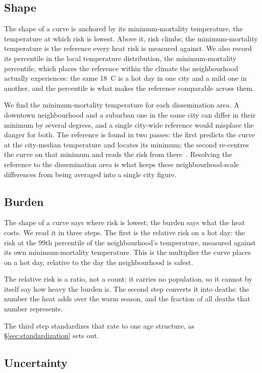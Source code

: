 \subsection{Shape}

The shape of a curve is anchored by its minimum-mortality temperature, the temperature at which risk is lowest. Above it, risk climbs; the minimum-mortality temperature is the reference every heat risk is measured against. We also record its percentile in the local temperature distribution, the minimum-mortality percentile, which places the reference within the climate the neighbourhood actually experiences: the same 18~\textdegree C is a hot day in one city and a mild one in another, and the percentile is what makes the reference comparable across them.

We find the minimum-mortality temperature for each dissemination area. A downtown neighbourhood and a suburban one in the same city can differ in their minimum by several degrees, and a single city-wide reference would misplace the danger for both. The reference is found in two passes: the first predicts the curve at the city-median temperature and locates its minimum; the second re-centres the curve on that minimum and reads the risk from there~\citep{gasparrini2022smallarea}. Resolving the reference to the dissemination area is what keeps these neighbourhood-scale differences from being averaged into a single city figure.

\subsection{Burden}

The shape of a curve says where risk is lowest; the burden says what the heat costs. We read it in three steps. The first is the relative risk on a hot day: the risk at the 99th percentile of the neighbourhood's temperature, measured against its own minimum-mortality temperature. This is the multiplier the curve places on a hot day, relative to the day the neighbourhood is safest.

The relative risk is a ratio, not a count: it carries no population, so it cannot by itself say how heavy the burden is. The second step converts it into deaths: the number the heat adds over the warm season, and the fraction of all deaths that number represents.

The third step standardizes that rate to one age structure, as \S\ref{sec:standardization} sets out.

\subsection{Uncertainty}

